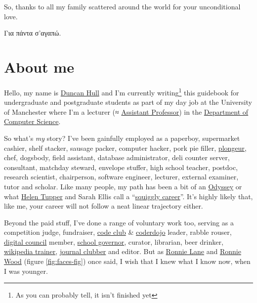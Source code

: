 \documentclass[
]{book}
\begin{document}
So, thanks to all my family scattered around the world for your unconditional love.

Για πάντα σ'αγαπώ. 🙏

\hypertarget{duncan}{%
\section{About me}\label{duncan}}

Hello, my name is \href{https://personalpages.manchester.ac.uk/staff/duncan.hull/}{Duncan Hull} and I'm currently writing\footnote{As you can probably tell, it isn't finished yet} this guidebook for undergraduate and postgraduate students as part of my day job at the University of Manchester where I'm a lecturer (≈ \href{https://en.wikipedia.org/wiki/Assistant_professor}{Assistant Professor}) in the \href{https://www.cs.manchester.ac.uk/}{Department of Computer Science}.

So what's \emph{my} story? I've been gainfully employed as a paperboy, supermarket cashier, shelf stacker, sausage packer, computer hacker, pork pie filler, \href{https://en.wikipedia.org/wiki/Plongeur}{plongeur}, chef, dogsbody, field assistant, database administrator, deli counter server, consultant, matchday steward, envelope stuffer, high school teacher, postdoc, research scientist, chairperson, software engineer, lecturer, external examiner, tutor and scholar. Like many people, my path has been a bit of an \href{https://en.wikipedia.org/wiki/Odyssey}{Odyssey} or what \href{https://twitter.com/HelenTupper}{Helen Tupper} and Sarah Ellis call a ``\href{https://www.amazingif.com/books/}{squiggly career}''. \citep{squigglybook} It's highly likely that, like me, your career will not follow a neat linear trajectory either. \citep{squigglytalk}

Beyond the paid stuff, I've done a range of voluntary work too, serving as a competition judge, fundraiser, \href{https://codeclub.org}{code club} \& \href{https://coderdojo.com}{coderdojo} leader, rabble rouser, \href{https://www.manchesterdigital.com/}{digital council} member, \href{https://governorsforschools.org.uk/}{school governor}, curator, librarian, beer drinker, \href{https://wiki-loves-scientists.org.uk/}{wikipedia trainer}, \href{https://sigcse.cs.manchester.ac.uk/}{journal clubber} and editor. But as \href{https://en.wikipedia.org/wiki/Ronnie_Lane}{Ronnie Lane} and \href{https://en.wikipedia.org/wiki/Ronnie_Wood}{Ronnie Wood} (figure \ref{fig:faces-fig}) once said, I wish that I knew what I know now, when I was younger.
\end{document}
